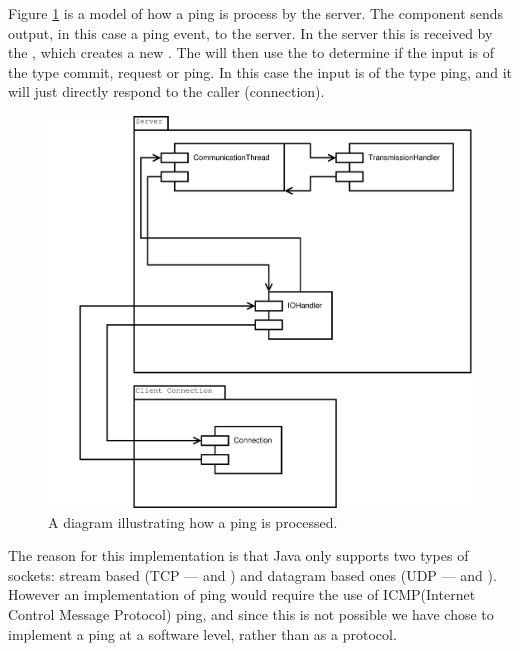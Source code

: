 Figure \ref{fig:IOPing} is a model of how a ping is process by the server. The  component sends output, in this case a ping event, to the server. In the server this is received by the , which creates a new \newline {}.
The  will then use the \newline {} to determine if the input is of the type commit, request or ping.
In this case the input is of the type ping, and it will just directly respond to the caller (connection).
\begin{figure}[htbp]
	\centering
          \includegraphics[scale=0.30]{images/ping.pdf}%
	\caption{A diagram illustrating how a ping is processed.} 
	\label{fig:IOPing}
\end{figure}

The reason for this implementation is that Java only supports two types of sockets: stream based (TCP ---  and ) and datagram based ones (UDP ---  \newline and )\cite{ICMP}\cite{javaNET}. However an implementation of ping would require the use of ICMP(Internet Control Message Protocol) ping, and since this is not possible we have chose to implement a ping at a software level, rather than as a protocol.


